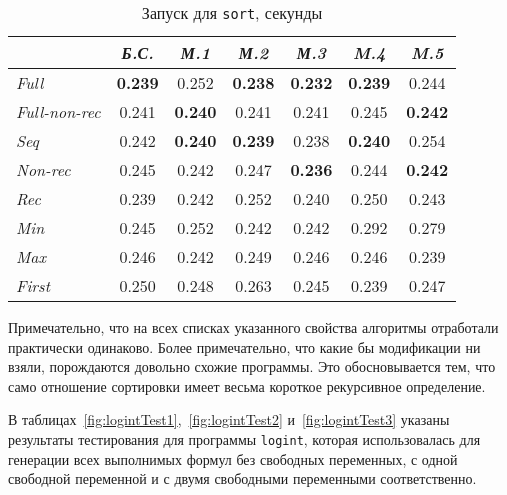 \begin{table}[h!]

\center
\begin{tabular}{|l|c|c|c|c|c|c|}
\hline
                  &{\it Б.С.}&{\it М.1}&{\it М.2}&{\it М.3}&{\it M.4}&{\it M.5}\\ \hline
{\it Full        } & {\bf 0.239} & 0.252       & {\bf 0.238} & {\bf 0.232} & {\bf 0.239} & 0.244 \\ \hline
{\it Full-non-rec} & 0.241       & {\bf 0.240} & 0.241       & 0.241       & 0.245       & {\bf 0.242} \\ \hline
{\it Seq         } & 0.242       & {\bf 0.240} & {\bf 0.239} & 0.238       & {\bf 0.240} & 0.254 \\ \hline
{\it Non-rec     } & 0.245       &  0.242      & 0.247       & {\bf 0.236} & 0.244       & {\bf 0.242} \\ \hline
{\it Rec         } & 0.239       &  0.242      & 0.252       & 0.240       & 0.250       & 0.243 \\ \hline
{\it Min         } & 0.245       & 0.252       & 0.242       & 0.242       & 0.292       & 0.279 \\ \hline
{\it Max         } & 0.246       & 0.242       & 0.249       & 0.246       & 0.246       & 0.239 \\ \hline
{\it First       } & 0.250       & 0.248       & 0.263       & 0.245       & 0.239       & 0.247 \\ \hline


\end{tabular}
\caption{Запуск для \lstinline{sort}, секунды}
\label{fig:sortTest}
\end{table}

Примечательно, что на всех списках указанного свойства алгоритмы отработали практически
одинаково. Более примечательно, что какие бы модификации ни взяли,
порождаются довольно схожие программы. Это обосновывается тем, что само отношение
сортировки имеет весьма короткое рекурсивное определение.

В таблицах~\ref{fig:logintTest1},~\ref{fig:logintTest2} и~\ref{fig:logintTest3} указаны результаты тестирования для
программы \lstinline{logint}, которая использовалась для генерации всех выполнимых формул
без свободных переменных, с одной свободной переменной и с двумя свободными переменными соответственно.

